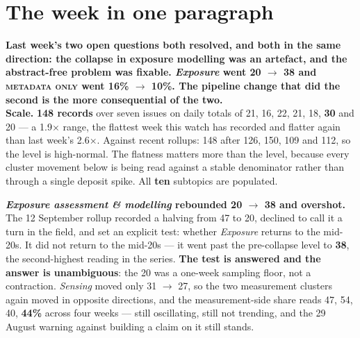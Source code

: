 \documentclass[10pt]{article}
\begin{document}
\vspace{6mm}

\section*{\sffamily\bfseries\color{Deep}The week in one paragraph}
\vspace{-1.5mm}{\color{Teal}\rule{\linewidth}{1.1pt}}\vspace{2.5mm}

\begin{keybox}
{\sffamily\bfseries\small\color{Deep}Last week's two open questions both resolved, and
both in the same direction: the collapse in exposure modelling was an artefact, and the
abstract-free problem was fixable. \textit{Exposure} went 20 $\rightarrow$ 38 and
\textsc{metadata only} went 16\% $\rightarrow$ 10\%. The pipeline change that did the
second is the more consequential of the two.}\\[1.4mm]
\footnotesize
\textbf{Scale.} \textbf{148 records} over seven issues on daily totals of 21, 16, 22, 21,
18, \textbf{30} and 20 --- a 1.9$\times$ range, the flattest week this watch has recorded
and flatter again than last week's 2.6$\times$. Against recent rollups: 148 after 126,
150, 109 and 112, so the level is high-normal. The flatness matters more than the level,
because every cluster movement below is being read against a stable denominator rather
than through a single deposit spike. All \textbf{ten} subtopics are populated.

\textbf{\textit{Exposure assessment \& modelling} rebounded 20 $\rightarrow$ 38 and
overshot.} The 12 September rollup recorded a halving from 47 to 20, declined to call it
a turn in the field, and set an explicit test: whether \textit{Exposure} returns to the
mid-20s. It did not return to the mid-20s --- it went past the pre-collapse level to
\textbf{38}, the second-highest reading in the series. \textbf{The test is answered and
the answer is unambiguous}: the 20 was a one-week sampling floor, not a contraction.
\textit{Sensing} moved only 31 $\rightarrow$ 27, so the two measurement clusters again
moved in opposite directions, and the measurement-side share reads 47, 54, 40,
\textbf{44\%} across four weeks --- still oscillating, still not trending, and the 29
August warning against building a claim on it still stands.


\end{keybox}
\end{document}
